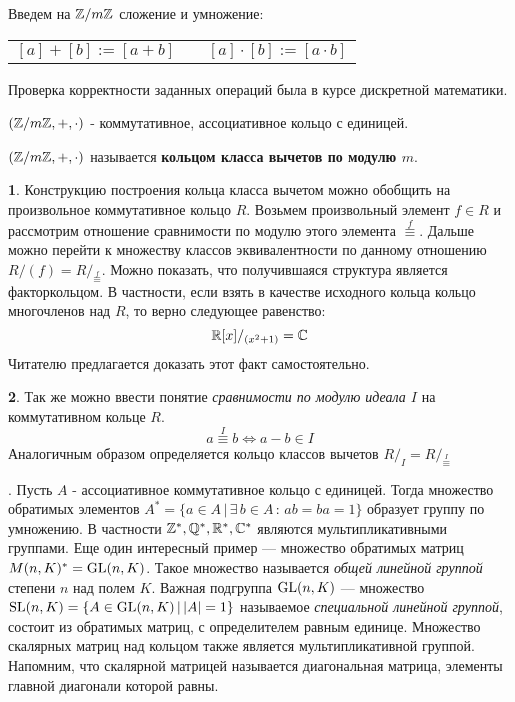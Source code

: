 \documentclass[../main.tex]{subfiles}
\begin{document}
Введем на $\mathbb{Z}/m\mathbb{Z}$ сложение и умножение:

\begin{center}
\begin{tabular}{l p{2.5cm} r}
    $[a] + [b ] := [a + b]$ &  & $[a] \cdot [b] := [a \cdot b]$
\end{tabular}
\end{center}

Проверка корректности заданных операций была в курсе дискретной математики.
\begin{theorem-non}
    $(\mathbb{Z}/m\mathbb{Z}, +, \cdot)$ - коммутативное, ассоциативное кольцо с единицей.
\end{theorem-non}
\begin{definition}
    $(\mathbb{Z}/m\mathbb{Z}, +, \cdot)$ называется \textbf{кольцом класса вычетов по модулю $m$}.
\end{definition}


\textbf{1}. Конструкцию построения кольца класса вычетом можно обобщить на произвольное коммутативное кольцо $R$. Возьмем произвольный элемент $f \in R$ и рассмотрим отношение сравнимости по модулю этого элемента {\scriptsize${\overset{f}{\equiv}}$}. Дальше можно перейти к множеству классов эквивалентности по данному отношению $R/(f) = R/_{\overset{f}{\equiv}}$. Можно показать, что получившаяся структура является факторкольцом. В частности, если взять в качестве исходного кольца кольцо многочленов над $R$, то верно следующее равенство:
\begin{equation*}
    \mathbb{R}[x]/_{(x^2 + 1)} = \mathbb{C}
\end{equation*}
Читателю предлагается доказать этот факт самостоятельно.
\pagebreak

\textbf{2}. Так же можно ввести понятие \textit{сравнимости по модулю идеала $I$} на коммутативном кольце $R$.
\begin{equation*}
    a \overset{I}{\equiv} b \iff a - b \in I
\end{equation*}
Аналогичным образом определяется кольцо классов вычетов $R/_I = R/_{{\overset{I}{\equiv}}}$

\textbf{}. Пусть $A$ - ассоциативное коммутативное кольцо с единицей. Тогда множество обратимых элементов \linebreak $A^{*} = \{a \in A \, | \, \exists \, b \in A \, : \, ab = ba = 1\}$ образует группу по умножению. В частности $\mathbb{Z}^{*}, \mathbb{Q}^{*}, \mathbb{R}^{*}, \mathbb{C}^{*}$ являются мультипликативными группами. Еще один интересный пример --- множество обратимых матриц $M(n, K)^{*} = \operatorname{GL}(n, K)$. Такое множество называется \textit{общей линейной группой} степени $n$ над полем $K$. Важная подгруппа $\operatorname{GL}(n, K)$ --- множество $\operatorname{SL}(n, K) = \{A \in \operatorname{GL}(n, K) \, | \, |A| = 1\}$ называемое \textit{специальной линейной группой}, состоит из обратимых матриц, с определителем равным единице. Множество скалярных матриц над кольцом также является мультипликативной группой. Напомним, что скалярной матрицей называется диагональная матрица, элементы главной диагонали которой равны.
\end{document}

